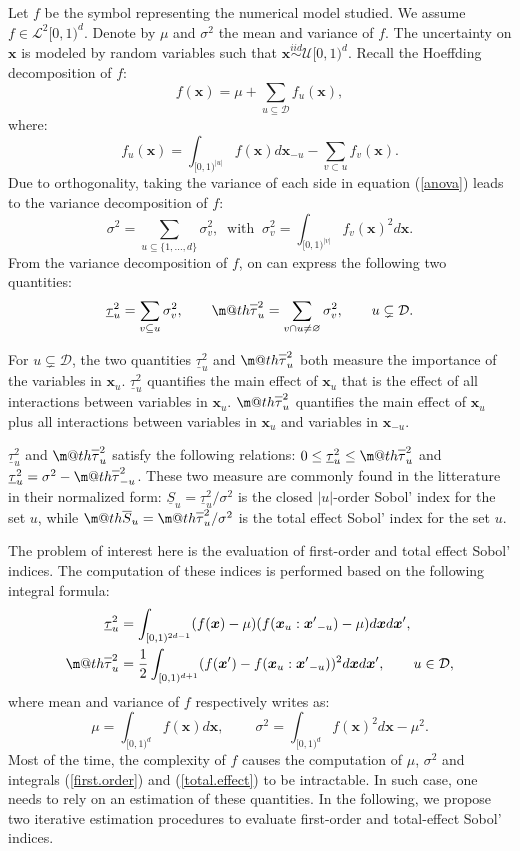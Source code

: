 \documentclass[]{elsarticle}
\makeatletter
\theoremstyle{definition}
\newcommand{\bvec}[1]{\boldsymbol{#1}}
\newcommand{\vx}{\bvec{x}}
\newcommand\iid{\stackrel{iid}{\sim}}
\newcommand*{\ov}[1]{
  \m@th\overline{\mbox{#1}\raisebox{2mm}{}}
}
\makeatother
\begin{document}
Let $f$ be the symbol representing the numerical model studied. We assume $f \in \mathcal{L}^2[0,1)^d$. Denote by $\mu$ and $\sigma^2$ the mean and variance of $f$.
The uncertainty on $\vx$ is modeled by random variables such that $\vx \iid \mathcal{U}[0,1)^d$. Recall the Hoeffding decomposition \cite{Hoeffding} of $f$:
\begin{equation}
f(\vx)=\mu+\sum \limits_{u \subseteq \mathcal{D}} f_u(\vx),
\label{anova}
\end{equation}
where:
\[f_u(\vx)= \int_{[0,1)^{|u|}} f(\vx) d{\vx}_{-u} - \sum \limits_{v \subset u} f_v(\vx).\]
Due to orthogonality, taking the variance of each side in equation (\ref{anova}) leads to the variance decomposition of $f$:
\[ \sigma^2 = \sum \limits_{u \subseteq \{1,\dots,d\}} \sigma_v^2, \ \text{ with } \ \sigma_v^2=\int_{[0,1)^{|v|}} f_v(\vx)^2 d{\vx}.\]
From the variance decomposition of $f$, on can express the following two quantities:
\[\underline{\tau}_u^2 = \sum \limits_{v \subseteq u} \sigma_v^2, \qquad
\ov{$\tau$}_u^2 = \sum \limits_{v \cap u \neq \varnothing} \sigma_v^2, \qquad u \subsetneq \mathcal{D}.\]

For $u \subsetneq \mathcal{D}$, the two quantities $\underline{\tau}_u^2$ and $\ov{$\tau$}_u^2$ both measure the importance of the variables in $\vx_u$. $\underline{\tau}_u^2$ quantifies the main effect of $\vx_u$ that is the effect of all interactions between variables in $\vx_u$. $\ov{$\tau$}_u^2$ quantifies the main effect of $\vx_u$ plus all interactions between variables in $\vx_u$ and variables in $\vx_{-u}$.

$\underline{\tau}_u^2$ and $\ov{$\tau$}_u^2$ satisfy the following relations: $ 0 \leq  \underline{\tau}_u^2 \leq \ov{$\tau$}_u^2$ and $\underline{\tau}_u^2 = \sigma^2 - \ov{$\tau$}_{-u}^2$. These two measure are commonly found in the litterature in their normalized form: $\underline{S}_u = \underline{\tau}_u^2 / \sigma^2$ is the closed $|u|$-order Sobol' index for the set $u$, while $\ov{$S$}_u = \ov{$\tau$}_u^2 / \sigma^2$ is the total effect Sobol' index for the set $u$.
\bigskip

The problem of interest here is the evaluation of first-order and total effect Sobol' indices. The computation of these indices is performed based on the following integral formula:
\begin{align}
\label{first.order}
\underline{\tau}_u^2  &= \int_{[0,1)^{2d-1}} (f(\vx)-\mu)(f(\vx_{u}:{\vx'}_{-u})-\mu)d\vx d{\vx'}, \\
\label{total.effect}
\ov{$\tau$}_u^2 &= \frac{1}{2}\int_{[0,1)^{d+1}}(f(\vx')-f(\vx_u:{\vx'}_{-u}))^2d\vx d{\vx'}, \qquad u \in \mathcal{D},
\end{align}
where mean and variance of $f$ respectively writes as:
\[ \mu = \int_{[0,1)^{d}} f(\vx) d{\vx}, \ \qquad
\sigma^2 = \int_{[0,1)^{d}} f(\vx)^2d{\vx} - \mu^2 .\]
Most of the time, the complexity of $f$ causes the computation of $\mu$, $\sigma^2$ and integrals (\ref{first.order}) and (\ref{total.effect}) to be intractable. In such case, one needs to rely on an estimation of these quantities. In the following, we propose two iterative estimation procedures to evaluate first-order and total-effect Sobol' indices.
\end{document}
